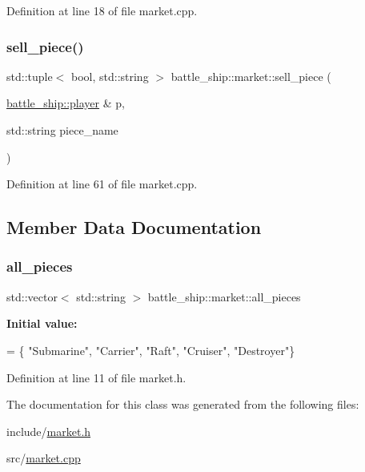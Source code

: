 Definition at line 18 of file market.\+cpp.

\mbox{\label{classbattle__ship_1_1market_a9f0233812e846d7c2f111c2d1721a2a1}} 
\subsubsection{\texorpdfstring{sell\+\_\+piece()}{sell\_piece()}}
{\footnotesize\ttfamily std\+::tuple$<$ bool, std\+::string $>$ battle\+\_\+ship\+::market\+::sell\+\_\+piece (\begin{DoxyParamCaption}\item[{\hyperlink{classbattle__ship_1_1player}{battle\+\_\+ship\+::player} \&}]{p,  }\item[{std\+::string}]{piece\+\_\+name }\end{DoxyParamCaption})\hspace{0.3cm}{\ttfamily [static]}}



Definition at line 61 of file market.\+cpp.



\subsection{Member Data Documentation}
\mbox{\label{classbattle__ship_1_1market_a1bc7fb6748d38524516703c171a7041d}} 
\subsubsection{\texorpdfstring{all\+\_\+pieces}{all\_pieces}}
{\footnotesize\ttfamily std\+::vector$<$ std\+::string $>$ battle\+\_\+ship\+::market\+::all\+\_\+pieces\hspace{0.3cm}{\ttfamily [static]}}

{\bfseries Initial value\+:}
\begin{DoxyCode}
= \{
    \textcolor{stringliteral}{"Submarine"}, \textcolor{stringliteral}{"Carrier"}, \textcolor{stringliteral}{"Raft"}, \textcolor{stringliteral}{"Cruiser"}, \textcolor{stringliteral}{"Destroyer"}\}
\end{DoxyCode}


Definition at line 11 of file market.\+h.



The documentation for this class was generated from the following files\+:\begin{DoxyCompactItemize}
\item 
include/\hyperlink{market_8h}{market.\+h}\item 
src/\hyperlink{market_8cpp}{market.\+cpp}\end{DoxyCompactItemize}
